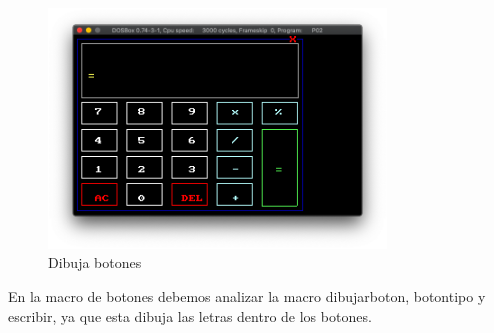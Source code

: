 \documentclass[letterpaper,12 pt,titlepage]{article}
\begin{document}
    \begin{figure}[H]
    \centering
    \includegraphics[width=0.8\textwidth]{img/14.png}
    \caption{Dibuja botones}
    \end{figure}

    En la macro de botones debemos analizar la macro dibujarboton, botontipo y escribir, ya que esta dibuja las letras dentro de los botones.
\end{document}
